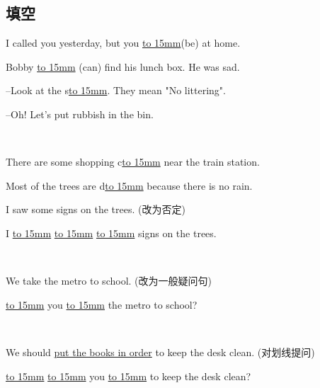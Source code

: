 \subsection{填空}
\item{
    I called you yesterday, but you \underline{\hbox to 15mm{}}(be) at home.
}
\\
\item{
    Bobby \underline{\hbox to 15mm{}} (can) find his lunch box. He was sad.
}
\\
\item{
    --Look at the s\underline{\hbox to 15mm{}}. They mean "No littering". 

    --Oh! Let's put rubbish in the bin.
}
\\
\item{
    There are some shopping c\underline{\hbox to 15mm{}} near the train station.
}
\\
\item{
    Most of the trees are d\underline{\hbox to 15mm{}} because there is no rain.
}
\\
\item{
    I saw some signs on the trees. (改为否定)
    
    I \underline{\hbox to 15mm{}} \underline{\hbox to 15mm{}} \underline{\hbox to 15mm{}} signs on the trees.
}
\\
\item{
    We take the metro to school. (改为一般疑问句)
    
    \underline{\hbox to 15mm{}} you \underline{\hbox to 15mm{}} the metro to school?
}
\\
\item{
    We should \underline{put the books in order} to keep the desk clean. (对划线提问)
    
    \underline{\hbox to 15mm{}} \underline{\hbox to 15mm{}} you \underline{\hbox to 15mm{}} to keep the desk clean?
}
\\


